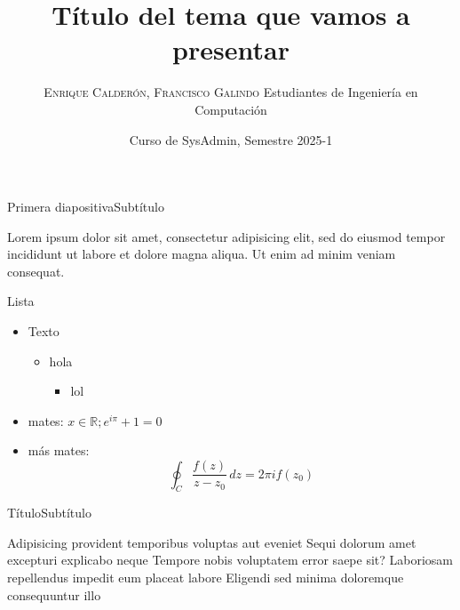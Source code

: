 \documentclass[pdf]{beamer}
\title[Título corto]{Título del tema que vamos a presentar}
\author{%
    {\textsc{Enrique Calderón, Francisco Galindo}} \newline
    Estudiantes de Ingeniería en Computación
}
\institute{%
    \textit{Universidad Nacional Autónoma de México}\\
    \textit{Facultad de Ingeniería}
}
\date{Curso de SysAdmin, Semestre 2025-1}
\begin{document}
    \begin{frame}
        \titlepage
    \end{frame}
    
    \begin{frame}{Primera diapositiva}{Subtítulo}

        Lorem ipsum dolor sit amet, consectetur adipisicing elit, sed do
        eiusmod tempor incididunt ut labore et dolore magna aliqua. Ut enim ad
        minim veniam consequat.

        Lista
        \begin{itemize}
            \item Texto
                \begin{itemize}
                    \item hola
                        \begin{itemize}
                            \item lol
                        \end{itemize}
                \end{itemize}
            \item mates: \( x \in \mathbb{R}; e^{i \pi} + 1 = 0 \)
            \item más mates:
            \[
                \oint_C \frac{f(z)}{z-z_0}\, dz = 2 \pi i f(z_0)
            \]
        \end{itemize}
    \end{frame}

    \begin{frame}{Título}{Subtítulo}

        Adipisicing provident temporibus voluptas aut eveniet Sequi dolorum
        amet excepturi explicabo neque Tempore nobis voluptatem error saepe
        sit? Laboriosam repellendus impedit eum placeat labore Eligendi sed
        minima doloremque consequuntur illo

    \end{frame}
\end{document}
